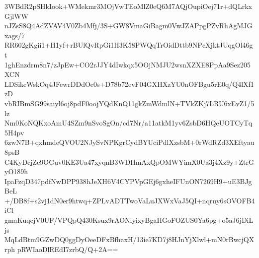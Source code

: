 3WBdR2pSHkIook+WMekmr3MOjVwTEoMlZ0eQ6M7AQjOupiOej71r+dQLrkxGjlWW
nJZsS8Q4AdZVAV4V0Zb4Mfj/3S+GW8VmaGiBagm0VwJZAPpgPZvRhAgMJGxags/7
RR602gKgii1+H1yf+rBUlQvRpGi1H3K58PWQqTrOidDttb9NPcXjktJUqgOl46gt
1ghEnzdrm8n7/zJpEw+CO2rJJY4dIwkqx5OOjNMJU2wsnXZXE8PpAa9Sez205XCN
LDSikcWskOq4JFewrDDdOe0s+D78b72evF04GXHXzYU0nOFBgu5rE0q/Q4lXf1zD
vbRIBmSG99saiyl6oj8pdF0oojYQdKnQ11gkZmWdmlN+TVkZKj7LRU6xEvZ1/5lz
Nm0KoNQKxoAmU4SZm9nSvoSgOn/cd7Nr/a11atkM1yv6ZsbD6HQeUOTCyTq5H4pv
6zwN7B+qxhmdeQVOU2NJySvNPKgrCydBYUciPdlXzsbM+0rWdRZd3XEftyau8psB
C4KyDcjZe9OGuv0KE3Ua47xyqnB3WDHmAxQpOMWYimX0Ua3j4Xz9y+ZtrGyO189h
IpaFzqD347pdfNwDPP938hJeXH6V4CYPVpGEj6gxheIFUnON7269H9+uE3BJgBeL
+/DB8f+s2vj1dN0er9htwq+ZPLvADTTwoVaLuJXWxVaJ5QI+nqruy6sOVOFB4iCl
gmaKuqcjV0UF/VPQpQ430Ksux9rAONlyixyBgaHGoFOZUS0Ya6pg+o5aJ6jDiLjs
MqLdBtm9GZwDQ0ggDyOeeDFxBfhaxH/13ie7KD7j8HJnYjXlwl+mN0rBwcjQXrph
pRWIaoDlREdI7zrbQ/Q+2A==
